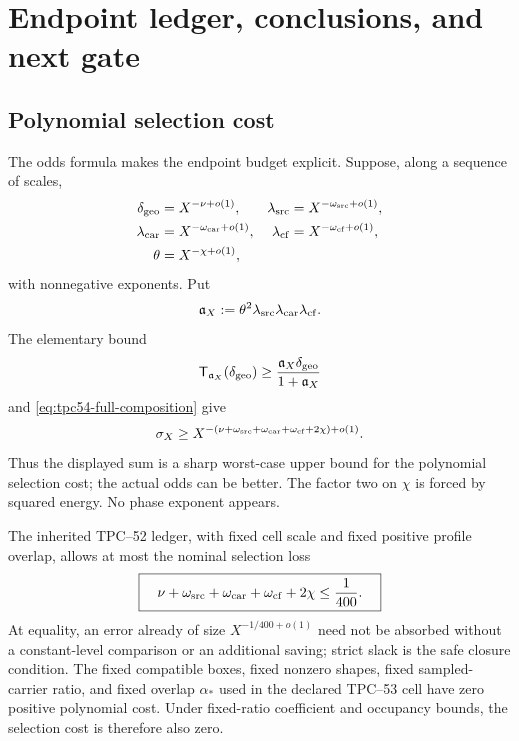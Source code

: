 \section{Endpoint ledger, conclusions, and next gate}
\label{sec:endpoint}

\subsection{Polynomial selection cost}

The odds formula makes the endpoint budget explicit.  Suppose, along a
sequence of scales,
\begin{align}
 \delta_{\rm geo}&=X^{-\nu+o(1)},
 &\lambda_{\rm src}&=X^{-\omega_{\rm src}+o(1)},
 \nonumber\\
 \lambda_{\rm car}&=X^{-\omega_{\rm car}+o(1)},
 &\lambda_{\rm cf}&=X^{-\omega_{\rm cf}+o(1)},
 \nonumber\\
 \theta&=X^{-\chi+o(1)},
 \label{eq:tpc54-polynomial-data}
\end{align}
with nonnegative exponents.  Put
\[
 \mathfrak a_X
 :=\theta^2\lambda_{\rm src}\lambda_{\rm car}\lambda_{\rm cf}.
\]
The elementary bound
\[
 \mathsf T_{\mathfrak a_X}(\delta_{\rm geo})
 \ge\frac{\mathfrak a_X\delta_{\rm geo}}{1+\mathfrak a_X}
\]
and \eqref{eq:tpc54-full-composition} give
\begin{equation}
 \sigma_X\ge
 X^{-(\nu+\omega_{\rm src}+\omega_{\rm car}
          +\omega_{\rm cf}+2\chi)+o(1)}.
 \label{eq:tpc54-selection-exponent}
\end{equation}
Thus the displayed sum is a sharp worst-case upper bound for the
polynomial selection cost; the actual odds can be better.  The factor two
on \(\chi\) is forced by squared energy.  No phase exponent appears.

The inherited TPC--52 ledger, with fixed cell scale and fixed positive
profile overlap, allows at most the nominal selection loss
\begin{equation}
 \boxed{\quad
 \nu+\omega_{\rm src}+\omega_{\rm car}
     +\omega_{\rm cf}+2\chi
 \le\frac1{400}.
 \quad}
 \label{eq:tpc54-endpoint-budget}
\end{equation}
At equality, an error already of size \(X^{-1/400+o(1)}\) need not be
absorbed without a constant-level comparison or an additional saving;
strict slack is the safe closure condition.  The fixed compatible boxes,
fixed nonzero shapes, fixed sampled-carrier ratio, and fixed overlap
\(\alpha_*\) used in the declared TPC--53 cell have zero positive
polynomial cost.  Under fixed-ratio coefficient and occupancy bounds, the
selection cost is therefore also zero.

